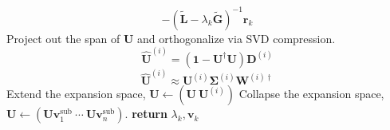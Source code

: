 \begin{algorithm}
\begin{algorithmic}[1]
\[                -
                (
                    \tilde{\mathbf{L}}
                    -
                    \lambda_k
                    \tilde{\mathbf{G}}
                )^{-1}
                \mathbf{r}_k
            \]
            \State
            Project out the span of \(\mathbf{U}\) and orthogonalize via
            SVD compression.
            \[
                \widehat{\mathbf{U}}^{(i)}
                =
                (\mathbf{1} - \mathbf{U}^\dagger \mathbf{U})
                \mathbf{D}^{(i)}
            \]
            \[
                \widehat{\mathbf{U}}^{(i)}
                \approx
                \mathbf{U}^{(i)}
                \mathbf{\Sigma}^{(i)}
                \mathbf{W}^{(i)\dagger}
            \]
                \State
                Extend the expansion space,
                \(
                    \mathbf{U}
                    \leftarrow
                    (\mathbf{U}\ \mathbf{U}^{(i)})
                \)
            \Else
                \State
                Collapse the expansion space,
                \(
                    \mathbf{U}
                    \leftarrow
                    (
                        \mathbf{U}
                        \mathbf{v}_1^\mathrm{sub}\ 
                        \cdots\ 
                        \mathbf{U}
                        \mathbf{v}_n^\mathrm{sub}
                    )
                \).
            \EndIf
        \EndFor
        \State
        {\bfseries return}
        \(
            \lambda_k,
            \mathbf{v}_k
        \)
        \EndProcedure
    \end{algorithmic}
\end{algorithm}


